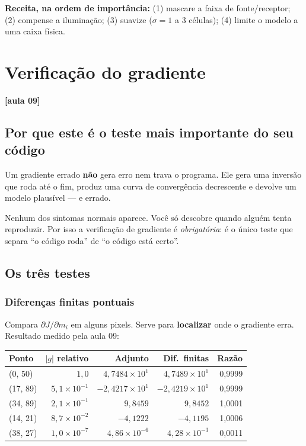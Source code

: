 \documentclass[11pt,a4paper,oneside]{report}
\newcommand{\aula}[1]{\textcolor{cianofwi}{\textbf{[aula #1]}}}
\begin{document}
\textbf{Receita, na ordem de importância:} (1) mascare a faixa de
fonte/receptor; (2) compense a iluminação; (3) suavize
($\sigma = 1$ a $3$ células); (4) limite o modelo a uma caixa física.

\chapter{Verificação do gradiente}
\label{cap:verificacao}

\aula{09}

\section{Por que este é o teste mais importante do seu código}

\begin{armadilha}
Um gradiente errado \textbf{não} gera erro nem trava o programa. Ele gera uma
inversão que roda até o fim, produz uma curva de convergência decrescente e
devolve um modelo plausível --- e errado.

Nenhum dos sintomas normais aparece. Você só descobre quando alguém tenta
reproduzir. Por isso a verificação de gradiente é \emph{obrigatória}: é o
único teste que separa ``o código roda'' de ``o código está certo''.
\end{armadilha}

\section{Os três testes}

\subsection{Diferenças finitas pontuais}

Compara $\partial J/\partial m_i$ em alguns pixels. Serve para
\textbf{localizar} onde o gradiente erra. Resultado medido pela aula 09:

\begin{center}
\begin{tabular}{@{}lrrrr@{}}
\toprule
\textbf{Ponto} & $|g|$ relativo & \textbf{Adjunto} & \textbf{Dif.\ finitas} & \textbf{Razão} \\
\midrule
(0, 50)  & $1{,}0$              & $4{,}7484\times10^{1}$  & $4{,}7489\times10^{1}$  & 0{,}9999 \\
(17, 89) & $5{,}1\times10^{-1}$ & $-2{,}4217\times10^{1}$ & $-2{,}4219\times10^{1}$ & 0{,}9999 \\
(34, 89) & $2{,}1\times10^{-1}$ & $9{,}8459$              & $9{,}8452$              & 1{,}0001 \\
(14, 21) & $8{,}7\times10^{-2}$ & $-4{,}1222$             & $-4{,}1195$             & 1{,}0006 \\
(38, 27) & $1{,}0\times10^{-7}$ & $4{,}86\times10^{-6}$   & $4{,}28\times10^{-3}$   & 0{,}0011 \\
\bottomrule
\end{tabular}
\end{center}
\end{document}
